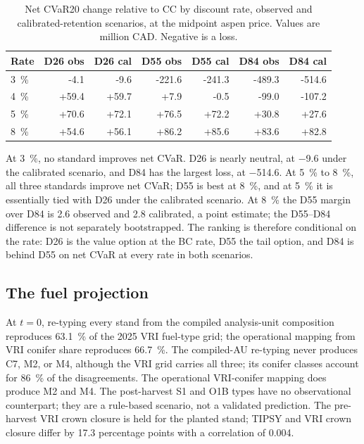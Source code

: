 \begin{table}[h]
    \centering
    \small
    \caption{Net CVaR20 change relative to CC by discount rate, observed and calibrated-retention
    scenarios, at the midpoint aspen price. Values are million CAD. Negative is a loss.}
    \label{tab:res_rates}
    \begin{tabular}{lrrrrrr}
        \toprule
        Rate & D26 obs & D26 cal & D55 obs & D55 cal & D84 obs & D84 cal \\
        \midrule
        \SI{3}{\percent} & -4.1 & -9.6 & -221.6 & -241.3 & -489.3 & -514.6 \\
        \SI{4}{\percent} & +59.4 & +59.7 & +7.9 & -0.5 & -99.0 & -107.2 \\
        \SI{5}{\percent} & +70.6 & +72.1 & +76.5 & +72.2 & +30.8 & +27.6 \\
        \SI{8}{\percent} & +54.6 & +56.1 & +86.2 & +85.6 & +83.6 & +82.8 \\
        \bottomrule
    \end{tabular}
\end{table}

At \SI{3}{\percent}, no standard improves net CVaR. D26 is nearly neutral, at \SI{-9.6}{\millionCAD} under
the calibrated scenario, and D84 has the largest loss, at \SI{-514.6}{\millionCAD}. At \SI{5}{\percent} to \SI{8}{\percent}, all three standards improve
net CVaR; D55 is best at \SI{8}{\percent}, and at \SI{5}{\percent} it is essentially tied with D26
under the calibrated scenario. At \SI{8}{\percent} the D55 margin over D84 is \SI{2.6}{\millionCAD}
observed and \SI{2.8}{\millionCAD} calibrated, a point estimate; the D55--D84 difference is not
separately bootstrapped. The ranking is therefore conditional on the rate: D26 is the value option at
the BC rate, D55 the tail option, and D84 is behind D55 on net CVaR at every rate in both scenarios.

\subsection{The fuel projection}

At $t=0$, re-typing every stand from the compiled analysis-unit composition reproduces
\SI{63.1}{\percent} of the 2025 VRI fuel-type grid; the operational mapping from VRI conifer share
reproduces \SI{66.7}{\percent}. The compiled-AU re-typing never produces C7, M2, or M4, although
the VRI grid carries all three; its conifer classes account for \SI{86}{\percent} of the
disagreements. The operational VRI-conifer mapping does produce M2 and M4. The
post-harvest S1 and O1B types have no observational counterpart; they are a rule-based scenario, not a validated prediction. The pre-harvest VRI crown
closure is held for the planted stand; TIPSY and VRI crown closure differ by
17.3 percentage points with a correlation of 0.004.

